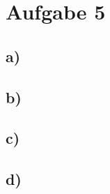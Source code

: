 \section{Aufgabe 5}
    \subsection{a)}


    \subsection{b)}
    

    \subsection{c)}


    \subsection{d)}